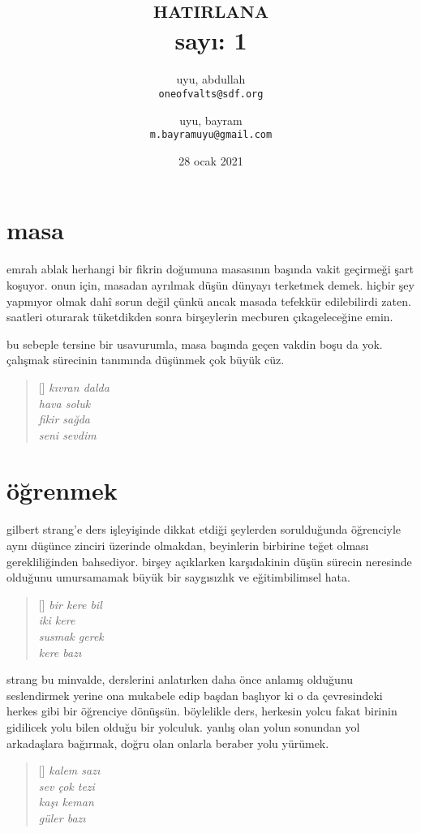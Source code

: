 \documentclass[a4paper, twocolumn]{memoir}
\author{
  uyu, abdullah\\
  \texttt{oneofvalts@sdf.org}
  \and
  uyu, bayram\\
  \texttt{m.bayramuyu@gmail.com}
}
\title{\textsc{hatirlana}\\\small sayı: 1}
\date{28 ocak 2021}
\begin{document}
\maketitle
\section{masa}
emrah ablak herhangi bir fikrin doğumuna masasının başında vakit
geçirmeği şart koşuyor. onun için, masadan ayrılmak düşün dünyayı
terketmek demek. hiçbir şey yapmıyor olmak dahî sorun değil çünkü ancak
masada tefekkür edilebilirdi zaten. saatleri oturarak tüketdikden sonra
birşeylerin mecburen çıkageleceğine emin.

bu sebeple tersine bir usavurumla, masa başında geçen vakdin boşu da yok.
çalışmak sürecinin tanımında düşünmek çok büyük cüz.
\begin{verse}[\versewidth]
  \itshape{}
  kıvran dalda\\
  hava soluk\\
  fikir sağda\\
  seni sevdim
\end{verse}
\section{öğrenmek}
gilbert strang'e ders işleyişinde dikkat etdiği şeylerden sorulduğunda
öğrenciyle aynı düşünce zinciri üzerinde olmakdan, beyinlerin birbirine
teğet olması gerekliliğinden bahsediyor. birşey açıklarken karşıdakinin
düşün sürecin neresinde olduğunu umursamamak büyük bir saygısızlık ve
eğitimbilimsel hata.
\begin{verse}[\versewidth]
  \itshape{}
  bir kere bil\\
  iki kere\\
  susmak gerek\\
  kere bazı
\end{verse}
strang bu minvalde, derslerini anlatırken daha önce anlamış
olduğunu seslendirmek yerine ona mukabele edip başdan başlıyor ki o da
çevresindeki herkes gibi bir öğrenciye dönüşsün. böylelikle ders,
herkesin yolcu fakat birinin gidilicek yolu bilen olduğu bir yolculuk.
yanlış olan yolun sonundan yol arkadaşlara bağırmak, doğru olan onlarla
beraber yolu yürümek.
\begin{verse}[\versewidth]
  \itshape{}
  kalem sazı\\
  sev çok tezi\\
  kaşı keman\\
  güler bazı
\end{verse}
\end{document}

